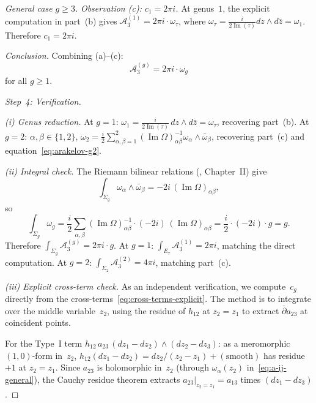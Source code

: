 \begin{proof}[General case $g \geq 3$]
\emph{Observation (c): $c_1 = 2\pi i$.}
At genus~$1$, the explicit computation in part~(b) gives
$\mathcal{A}_3^{(1)} = 2\pi i \cdot \omega_\tau$,
where $\omega_\tau = \frac{i}{2\operatorname{Im}(\tau)}
dz \wedge d\bar{z} = \omega_1$. Therefore $c_1 = 2\pi i$.

\emph{Conclusion.} Combining (a)--(c):
\begin{equation}\label{eq:arnold-general-result-final}
\boxed{
\mathcal{A}_3^{(g)}
= 2\pi i \cdot \omega_g
}
\end{equation}
for all $g \geq 1$.

\emph{Step~4: Verification.}

\emph{(i) Genus reduction.}
At $g = 1$: $\omega_1
= \frac{i}{2\operatorname{Im}(\tau)}\,dz\wedge d\bar{z}
= \omega_\tau$, recovering part~(b).
At $g = 2$: $\alpha,\beta \in \{1,2\}$,
$\omega_2 = \frac{i}{2}\sum_{\alpha,\beta=1}^2
(\operatorname{Im}\Omega)^{-1}_{\alpha\beta}
\omega_\alpha \wedge \bar\omega_\beta$,
recovering part~(c) and
equation~\eqref{eq:arakelov-g2}.

\emph{(ii) Integral check.}
The Riemann bilinear relations
(\cite{Fay73}, Chapter~II) give
\begin{equation}\label{eq:riemann-bilinear-normalization}
\int_{\Sigma_g} \omega_\alpha \wedge \bar\omega_\beta
= -2i\,(\operatorname{Im}\Omega)_{\alpha\beta},
\end{equation}
so
\begin{equation}\label{eq:arakelov-integral}
\int_{\Sigma_g}\omega_g
= \frac{i}{2}\sum_{\alpha,\beta}
 (\operatorname{Im}\Omega)^{-1}_{\alpha\beta}\cdot
 (-2i)\,(\operatorname{Im}\Omega)_{\alpha\beta}
= \frac{i}{2}\cdot(-2i)\cdot g
= g.
\end{equation}
Therefore
$\int_{\Sigma_g}\mathcal{A}_3^{(g)}
= 2\pi i \cdot g$.
At $g = 1$: $\int_{E_\tau}\mathcal{A}_3^{(1)} = 2\pi i$,
matching the direct computation. At $g = 2$:
$\int_{\Sigma_2}\mathcal{A}_3^{(2)} = 4\pi i$,
matching part~(c).

\emph{(iii) Explicit cross-term check.}
As an independent verification, we compute~$c_g$ directly
from the cross-terms~\eqref{eq:cross-terms-explicit}.
The method is to integrate over the middle variable~$z_2$,
using the residue of $h_{12}$ at $z_2 = z_1$ to extract
$\bar\partial a_{23}$ at coincident points.

For the Type~I term $h_{12}\,a_{23}\,(dz_1 - dz_2)\wedge
(dz_2 - dz_3)$: as a meromorphic $(1,0)$-form in~$z_2$,
$h_{12}(dz_1 - dz_2) = dz_2/(z_2 - z_1) + (\text{smooth})$
has residue~$+1$ at $z_2 = z_1$. Since $a_{23}$ is
holomorphic in~$z_2$ (through $\omega_\alpha(z_2)$
in~\eqref{eq:a-ij-general}), the Cauchy residue theorem
extracts $a_{23}|_{z_2 = z_1} = a_{13}$ times
$(dz_1 - dz_3)$.


\end{proof}
